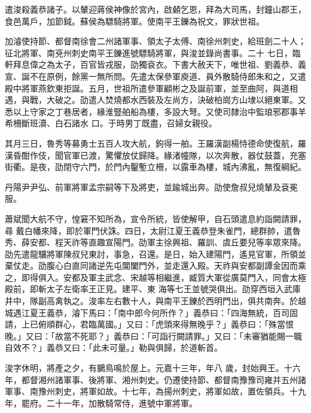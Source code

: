 \begin{pinyinscope}
 遣浚殺義恭諸子。以輦迎蔣侯神像於宮內，啟顙乞恩，拜為大司馬，封鐘山郡王，食邑萬戶，加節鉞。蘇侯為驃騎將軍。使南平王鑠為祝文，罪狀世祖。



 加濬使持節、都督南徐會二州諸軍事、領太子太傅、南徐州刺史，給班劍二十人；征北將軍、南兗州刺史南平王鑠進號驃騎將軍，與浚並錄尚書事。二十
 七日，臨軒拜息偉之為太子，百官皆戎服，劭獨袞衣。下書大赦天下，唯世祖、劉義恭、義宣、誕不在原例，餘黨一無所問。先遣太保參軍庾道、員外散騎侍郎朱和之，又遣殿中將軍燕欽東拒誕。五月，世祖所遣參軍顧彬之及誕前軍，並至曲阿，與道相遇，與戰，大破之。劭遣人焚燒都水西裝及左尚方，決破柏崗方山埭以絕東軍。又悉以上守家之丁巷居者，緣淮豎舶船為樓，多設大弩。又使司隸治中監琅邪郡事羊希柵斷班瀆、白石諸水
 口。于時男丁既盡，召婦女親役。



 其月三日，魯秀等募勇士五百人攻大航，鉤得一舶。王羅漢副楊恃德命使復航，羅漢昏酣作伎，聞官軍已渡，驚懼放仗歸降。緣渚幢隊，以次奔散，器仗鼓蓋，充塞街衢。是夜，劭閉守六門，於門內鑿塹立柵，以露車為樓，城內沸亂，無復綱紀。



 丹陽尹尹弘、前軍將軍孟宗嗣等下及將吏，並踰城出奔。劭使詹叔兒燒輦及袞冕服。



 蕭斌聞大航不守，惶窘不知所為，宣令所統，皆使解甲，自石頭遣息約詣闕請罪，尋
 戴白幡來降，即於軍門伏誅。四日，太尉江夏王義恭登朱雀門，總群帥，遣魯秀、薛安都、程天祚等直趣宣陽門。劭軍主徐興祖、羅訓、虞丘要兒等率眾來降。劭先遣龍驤將軍陳叔兒東討，事急，召還。是日，始入建陽門，遙見官軍，所領並棄仗走。劭腹心白直同諸逆先屯閶闔門外，並走還入殿。天祚與安都副譚金因而乘之，即得俱入。安都及軍主武念、宋越等相繼進，臧質大軍從廣莫門入，同會太極殿前，即斬太子左衛率王正見。建平、東
 海等七王並號哭俱出。劭穿西垣入武庫井中，隊副高禽執之。浚率左右數十人，與南平王鑠於西明門出，俱共南奔。於越城遇江夏王義恭，濬下馬曰：「南中郎今何所作？」義恭曰：「四海無統，百司固請，上已俯順群心，君臨萬國。」又曰：「虎頭來得無晚乎？」義恭曰：「殊當恨晚。」又曰：「故當不死耶？」義恭曰：「可詣行闕請罪。」又曰：「未審猶能賜一職自效不？」義恭又曰：「此未可量。」勒與俱歸，於道斬首。



 浚字休明，將產之夕，有鵩鳥鳴於屋上。元嘉十三年，年八
 歲，封始興王。十六年，都督湘州諸軍事、後將軍、湘州刺史。仍遷使持節、都督南豫豫司雍并五州諸軍事、南豫州刺史，將軍如故。十七年，為揚州刺史，將軍如故，置佐領兵。十九年，罷府。二十一年，加散騎常侍，進號中軍將軍。




\end{pinyinscope}
